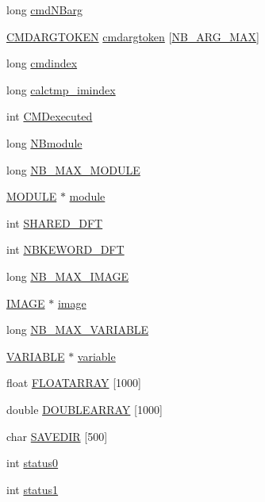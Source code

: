 \begin{DoxyCompactItemize}
\item 
long \hyperlink{structDATA_a6facd114f508ec4fcb52003b9f93d123}{cmd\+N\+Barg}
\item 
\hyperlink{structCMDARGTOKEN}{C\+M\+D\+A\+R\+G\+T\+O\+K\+E\+N} \hyperlink{structDATA_ae69d4eb8f85cb73bab5ed797b26bac9c}{cmdargtoken} \mbox{[}\hyperlink{src_2CLIcore_8h_a0a6b220d813ff622977cf6d7f1f5ffa6}{N\+B\+\_\+\+A\+R\+G\+\_\+\+M\+A\+X}\mbox{]}
\item 
long \hyperlink{structDATA_af462cdcbd42307c3dacf0891ba4dd8ca}{cmdindex}
\item 
long \hyperlink{structDATA_a11b6d226ab6612bc5a418abb89b56feb}{calctmp\+\_\+imindex}
\item 
int \hyperlink{structDATA_a51e21d55f2eeba8ae6c9f9f02311eeef}{C\+M\+Dexecuted}
\item 
long \hyperlink{structDATA_a4ef780e882fa0d3ad2462be54dc58f4e}{N\+Bmodule}
\item 
long \hyperlink{structDATA_aa3ce94f1c13e2a2b3acc31caca1f3b95}{N\+B\+\_\+\+M\+A\+X\+\_\+\+M\+O\+D\+U\+L\+E}
\item 
\hyperlink{structMODULE}{M\+O\+D\+U\+L\+E} $\ast$ \hyperlink{structDATA_a55d53cd2d9a1b3265c0207b41ceaaa35}{module}
\item 
int \hyperlink{structDATA_a64d5b0ed5d5cedf11ff69ebf8d30dc20}{S\+H\+A\+R\+E\+D\+\_\+\+D\+F\+T}
\item 
int \hyperlink{structDATA_aece2a33a30b5f15d8250cee2a8f0aa02}{N\+B\+K\+E\+W\+O\+R\+D\+\_\+\+D\+F\+T}
\item 
long \hyperlink{structDATA_a2522406c33b8f890757cfbd8db858f77}{N\+B\+\_\+\+M\+A\+X\+\_\+\+I\+M\+A\+G\+E}
\item 
\hyperlink{structIMAGE}{I\+M\+A\+G\+E} $\ast$ \hyperlink{structDATA_ad96d947dda9df8f8131e30c746528c5e}{image}
\item 
long \hyperlink{structDATA_adbdde6182898eaf675b02e337dc93750}{N\+B\+\_\+\+M\+A\+X\+\_\+\+V\+A\+R\+I\+A\+B\+L\+E}
\item 
\hyperlink{structVARIABLE}{V\+A\+R\+I\+A\+B\+L\+E} $\ast$ \hyperlink{structDATA_a106c7aa0d14584d90aa925257e99d368}{variable}
\item 
float \hyperlink{structDATA_a61336e8f5f1586474bec34d70788a188}{F\+L\+O\+A\+T\+A\+R\+R\+A\+Y} \mbox{[}1000\mbox{]}
\item 
double \hyperlink{structDATA_aca67d41b89d3518152bc65842ed55563}{D\+O\+U\+B\+L\+E\+A\+R\+R\+A\+Y} \mbox{[}1000\mbox{]}
\item 
char \hyperlink{structDATA_a312e0908dc985f6b4691f74a88ac6c93}{S\+A\+V\+E\+D\+I\+R} \mbox{[}500\mbox{]}
\item 
int \hyperlink{structDATA_a14eafa363f5cd5dd7ff9ca0744029565}{status0}
\item 
int \hyperlink{structDATA_acc1a46fa384934e24a89660d8d0c9f7a}{status1}
\end{DoxyCompactItemize}


